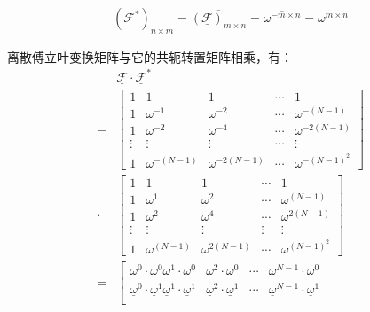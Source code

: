 \begin{align*}
	(\mathcal{F}^{*})_{n\times m} = \overline{(\underline{\mathcal{F}})_{m\times n}} = \overline{\omega^{-m\times n}} = \omega^{m\times n}
\end{align*}

离散傅立叶变换矩阵与它的共轭转置矩阵相乘，有：
\begin{align*}
	      & \underline{\mathcal{F}}\cdot \underline{\mathcal{F}}^{*} \\
	=     &
	\left[
		\begin{matrix}
			1      & 1               & 1                & \cdots & 1                 \\
			1      & \omega^{-1}     & \omega^{-2}      & \cdots & \omega^{-(N-1)}   \\
			1      & \omega^{-2}     & \omega^{-4}      & \cdots & \omega^{-2(N-1)}  \\
			\vdots & \vdots          & \vdots           & \cdots & \vdots            \\
			1      & \omega^{-(N-1)} & \omega^{-2(N-1)} & \cdots & \omega^{-(N-1)^2}
		\end{matrix}
		\right]                                                          \\
	\cdot &
	\left[
		\begin{matrix}
			1      & 1              & 1               & \cdots & 1                \\
			1      & \omega^{1}     & \omega^{2}      & \cdots & \omega^{(N-1)}   \\
			1      & \omega^{2}     & \omega^{4}      & \cdots & \omega^{2(N-1)}  \\
			\vdots & \vdots         & \vdots          & \vdots & \vdots           \\
			1      & \omega^{(N-1)} & \omega^{2(N-1)} & \cdots & \omega^{(N-1)^2}
		\end{matrix}
		\right]                                                          \\
	=     & \left[
		\begin{matrix}\underline{\omega}^0\cdot\underline{\omega}^0
			\underline{\omega}^1\cdot\underline{\omega}^0                                                      & \underline{\omega}^2\cdot\underline{\omega}^0     & \cdots & \underline{\omega}^{N-1}\cdot\underline{\omega}^0     \\
			\underline{\omega}^0\cdot\underline{\omega}^1\underline{\omega}^1\cdot\underline{\omega}^1         & \underline{\omega}^2\cdot\underline{\omega}^1     & \cdots & \underline{\omega}^{N-1}\cdot\underline{\omega}^1     \\

\end{matrix}
\end{align*}

